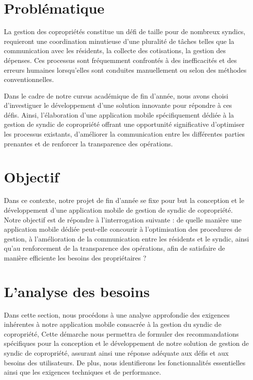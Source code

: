 \section{Problématique}
La gestion des copropriétés constitue un défi de taille pour de nombreux syndics, requieront une coordination minutieuse d'une pluralité de tâches telles que la communication avec les résidents, la collecte des cotisations, la gestion des dépenses. Ces processus sont fréquemment confrontés à des inefficacités et des erreurs humaines lorsqu'elles sont conduites manuellement ou selon des méthodes conventionnelles.

Dans le cadre de notre cursus académique de fin d'année, nous avons choisi d'investiguer le développement d'une solution innovante pour répondre à ces défis. Ainsi, l'élaboration d'une application mobile spécifiquement  dédiée à la gestion de syndic de copropriété offrant une opportunité significative d'optimiser les processus existants, d'améliorer la communication entre les différentes parties prenantes et de renforcer la transparence des opérations.
\section{Objectif}
Dans ce contexte, notre projet de fin d'année se fixe pour but  la conception et le développement d'une application mobile de gestion de syndic de copropriété. Notre objectif est de répondre à l'interrogation suivante :
de quelle manière une application mobile dédiée peut-elle concourir à l'optimisation des procedures de gestion, à l'amélioration de la communication entre les résidents et le syndic, ainsi qu'au renforcement de la transparence des opérations, afin de satisfaire de manière efficiente les besoins des propriétaires ?

\section{L'analyse des besoins}
Dans cette section, nous procédons à une analyse approfondie des exigences inhérentes à notre application mobile consacrée à la gestion du syndic de copropriété, Cette démarche nous permettra de formuler des recommandations spécifiques pour la conception et le développement de notre solution de gestion de syndic de copropriété, assurant ainsi une réponse adéquate aux défis et aux besoins des utilisateurs. De plus, nous identifierons les fonctionnalités essentielles ainsi que les exigences techniques et de performance.

